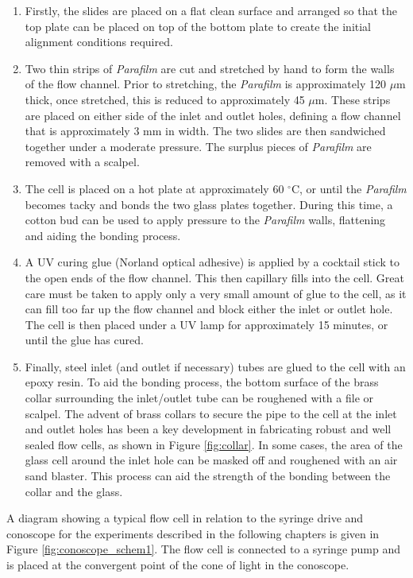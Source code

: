 \begin{enumerate}
\item 
Firstly, the slides are placed on a flat clean surface and arranged so that the top plate can be placed on top of the bottom plate to create the initial alignment conditions required.
\item
Two thin strips of \textit{Parafilm} are cut and stretched by hand to form the walls of the flow channel. Prior to stretching, the \textit{Parafilm} is approximately 120 $\mu$m thick, once stretched, this is reduced to approximately 45 $\mu$m. These strips are placed on either side of the inlet and outlet holes, defining a flow channel that is approximately 3 mm in width. The two slides are then sandwiched together under a moderate pressure. The surplus pieces of \textit{Parafilm} are removed with a scalpel.
\item
The cell is placed on a hot plate at approximately 60 $^{\circ}$C, or until the \textit{Parafilm} becomes tacky and bonds the two glass plates together. During this time, a cotton bud can be used to apply pressure to the \textit{Parafilm} walls, flattening and aiding the bonding process.
\item
A UV curing glue (Norland optical adhesive) is applied by a cocktail stick to the open ends of the flow channel. This then capillary fills into the cell. Great care must be taken to apply only a very small amount of glue to the cell, as it can fill too far up the flow channel and block either the inlet or outlet hole. The cell is then placed under a UV lamp for approximately 15 minutes, or until the glue has cured.
\item
Finally, steel inlet (and outlet if necessary) tubes are glued to the cell with an epoxy resin. To aid the bonding process, the bottom surface of the brass collar surrounding the inlet/outlet tube can be roughened with a file or scalpel. The advent of brass collars to secure the pipe to the cell at the inlet and outlet holes has been a key development in fabricating robust and well sealed flow cells, as shown in Figure \ref{fig:collar}. In some cases, the area of the glass cell around the inlet hole can be masked off and roughened with an air sand blaster. This process can aid the strength of the bonding between the collar and the glass.
\end{enumerate}

A diagram showing a typical flow cell in relation to the syringe drive and conoscope for the experiments described in the following chapters is given in Figure \ref{fig:conoscope_schem1}. The flow cell is connected to a syringe pump and is placed at the convergent point of the cone of light in the conoscope.


